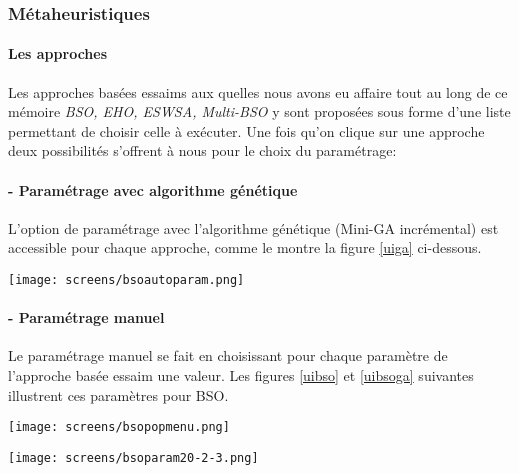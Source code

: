 \subsubsection{Métaheuristiques}

\paragraph{Les approches}
Les approches basées essaims aux quelles nous avons eu affaire tout au long de ce mémoire \textit{BSO, EHO, ESWSA, Multi-BSO} y sont proposées sous forme d'une liste permettant de choisir celle à exécuter.
Une fois qu'on clique sur une approche deux possibilités s'offrent à nous pour le choix du paramétrage:


\paragraph{- Paramétrage avec algorithme génétique}
L'option de paramétrage avec l'algorithme génétique (Mini-GA incrémental) est accessible pour chaque approche, comme le montre la figure \ref{uiga} ci-dessous.

\begin{center}	  
	\captionsetup{width=1\linewidth}
	\texttt{[image: screens/bsoautoparam.png]}%
	\vspace{-0.1 cm}
	\label{uiga}%
\end{center}

\paragraph{- Paramétrage manuel}
Le paramétrage manuel se fait en choisissant pour chaque paramètre de l'approche basée essaim une valeur.
Les figures \ref{uibso} et \ref{uibsoga} suivantes illustrent ces paramètres pour BSO.

\begin{minipage}{0.5\textwidth}
	\centering
	\texttt{[image: screens/bsopopmenu.png]}%
	\vspace{-0.1 cm}
	\label{uibso}%
\end{minipage}%
\begin{minipage}{0.5\textwidth}
	\centering	  
	\captionsetup{width=0.6\linewidth}
	\texttt{[image: screens/bsoparam20-2-3.png]}%
	\vspace{-0.1 cm}
	\label{uibsoga}%
\end{minipage}

